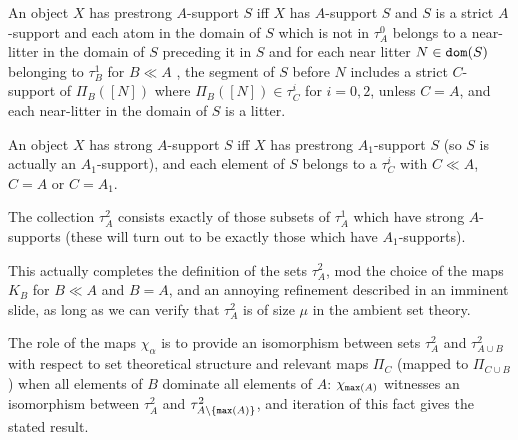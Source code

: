 \documentclass{slides}
\begin{document}
\begin{slide}

An object $X$ has prestrong $A$-support $S$ iff $X$ has $A$-support $S$ and $S$ is a strict $A$-support and each atom in the domain of $S$ which is not in $\tau^0_A$ belongs to a near-litter in the domain of $S$ preceding it in $S$ and for each near litter $N \in{\tt dom}(S)$ belonging to $\tau^1_B$ for $B \ll A$%
, the segment of $S$
before $N$ includes  a strict $C$-support of $\Pi_B([N])$ where  $\Pi_B([N])\in \tau^i_C$ for $i=0,2$, unless $C=A$, and each near-litter in the domain of $S$ is a litter.

An object $X$ has strong $A$-support $S$ iff $X$ has prestrong $A_1$-support $S$ (so $S$ is actually an $A_1$-support), and each element of $S$ belongs to 
a $\tau^i_C$ with $C \ll A$, $C=A$ or $C = A_1$.

\end{slide}

\begin{slide}

The collection $\tau^2_A$ consists exactly of those subsets of $\tau^1_A$ which have strong $A$-supports (these will turn out to be exactly those which have $A_1$-supports).

This actually completes the definition of the sets $\tau^2_A$, mod the choice of the maps $K_B$ for $B \ll A$ and $B=A$, and an annoying refinement described in an imminent slide, as long as we can verify that $\tau^2_A$ is of size $\mu$
in the ambient set theory.

The role of the maps $\chi_{\alpha}$ is to provide an isomorphism between sets $\tau^2_A$ and $\tau^2_{A \cup B}$ with respect to set theoretical structure and relevant maps $\Pi_C$ (mapped to $\Pi_{C \cup B}$) when all elements of $B$ dominate all elements of $A$:
$\chi_{{\tt max}(A)}$ witnesses an isomorphism between $\tau^2_A$ and $\tau^2_{A \setminus \{{\tt max}(A)\}}$, and iteration of this fact gives the stated result.

\end{slide}
\end{document}
